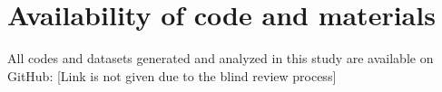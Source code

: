 \documentclass[referee,bst/sn-basic]{sn-jnl}%
\theoremstyle{thmstyletwo}%
\theoremstyle{thmstylethree}%
\begin{document}
\begin{comment}
Abraham (Avi) Seidmann is the Everett W. Lord Distinguished Faculty Scholar of Information Systems and an Associate Research Director for Health Analytics and Digital Health at the Questrom Digital Business Institute. He is a national expert in Business and Medical Management, social media and digital Health, and Telemedicine. Prof Seidmann has led clinical and economic research in these areas for over 25 years. He has published over one hundred research articles and has over 9,900 research citations. In October 2012, he was named a “Distinguished Fellow” by the Information Systems Society of the Institute of Operations Research and Management Sciences (INFORMS).

\end{comment}


\section*{Availability of code and materials}
All codes and datasets generated and analyzed in this study are available on GitHub: [Link is not given due to the blind review process]%





% 
 

\newpage

\end{document}
